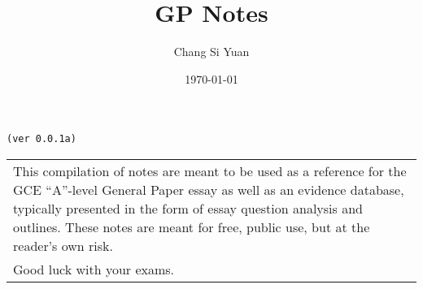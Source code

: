 \documentclass[a4paper]{article}
\author{Chang Si Yuan}
\title{GP Notes}
\date{\today}
\begin{document}
\maketitle

\begin{center}

	\texttt{(ver 0.0.1a)}

	\vspace{50pt}

	\begin{tabular}{>{\flushleft}p{8cm}}
	This compilation of notes are meant to be used as a reference for the GCE ``A''-level General Paper essay as well as an evidence database, typically presented in the form of essay question analysis and outlines. These notes are meant for free, public use, but at the reader's own risk. \\
	Good luck with your exams.
	\end{tabular}

\end{center}

\newpage
\end{document}
